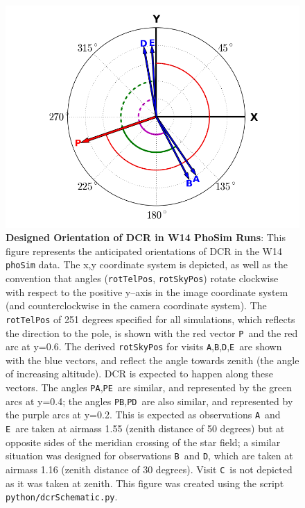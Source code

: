 \documentclass[DM,toc]{lsstdoc}
\def\A{{\tt A}}
\def\B{{\tt B}}
\def\C{{\tt C}}
\def\D{{\tt D}}
\def\E{{\tt E}}
\def\P{{\tt P}}
\begin{document}
\begin{figure}[!ht]
  \centering
  \includegraphics[width=1.1\textwidth]{dcrPhoSim.png}
  \caption{{\bf Designed Orientation of DCR in W14 PhoSim Runs}: This
    figure represents the anticipated orientations of DCR in the W14
    {\tt phoSim} data.  The x,y coordinate system is depicted, as well
    as the convention that angles ({\tt rotTelPos}, {\tt rotSkyPos})
    rotate clockwise with respect to the positive y--axis in the image
    coordinate system (and counterclockwise in the camera coordinate
    system).  The {\tt rotTelPos} of 251 degrees specified for all
    simulations, which reflects the direction to the pole, is shown
    with the red vector \P\ and the red arc at y=0.6.  The derived
    {\tt rotSkyPos} for visits \A,\B,\D,\E\ are shown with the blue
    vectors, and reflect the angle towards zenith (the angle of
    increasing altitude).  DCR is expected to happen along these
    vectors.  The angles \P\A,\P\E\ are similar, and represented by
    the green arcs at y=0.4; the angles \P\B,\P\D\ are also similar,
    and represented by the purple arcs at y=0.2.  This is expected as
    observations \A\ and \E\ are taken at airmass 1.55 (zenith
    distance of 50 degrees) but at opposite sides of the meridian
    crossing of the star field; a similar situation was designed for
    observations \B\ and \D, which are taken at airmass 1.16 (zenith
    distance of 30 degrees).  Visit \C\ is not depicted as it was
    taken at zenith.  This figure was created using the script {\tt
      python/dcrSchematic.py}.}
  \label{fig:phosimdcr}
\end{figure}
\end{document}
